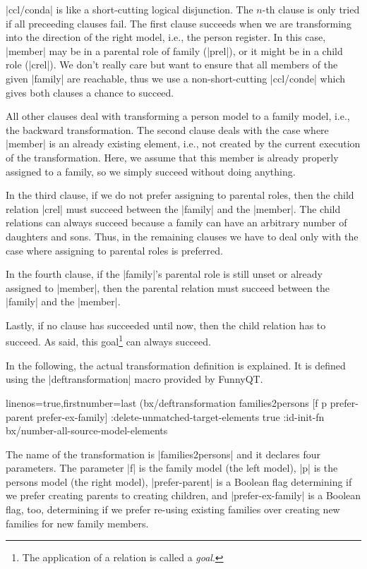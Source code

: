 \documentclass[a4paper]{article}
\newcommand{\code}{\clojureinline}
\begin{document}
\code|ccl/conda| is like a short-cutting logical disjunction.  The \(n\)-th
clause is only tried if all preceeding clauses fail.  The first clause succeeds
when we are transforming into the direction of the right model, i.e., the
person register.  In this case, \code|member| may be in a parental role of
family (\code|prel|), or it might be in a child role (\code|crel|).  We don't
really care but want to ensure that all members of the given \code|family| are
reachable, thus we use a non-short-cutting \code|ccl/conde| which gives both
clauses a chance to succeed.

All other clauses deal with transforming a person model to a family model,
i.e., the backward transformation.  The second clause deals with the case where
\code|member| is an already existing element, i.e., not created by the current
execution of the transformation.  Here, we assume that this member is already
properly assigned to a family, so we simply succeed without doing anything.

In the third clause, if we do not prefer assigning to parental roles, then the
child relation \code|crel| must succeed between the \code|family| and the
\code|member|.  The child relations can always succeed because a family can
have an arbitrary number of daughters and sons.  Thus, in the remaining clauses
we have to deal only with the case where assigning to parental roles is
preferred.

In the fourth clause, if the \code|family|'s parental role is still unset or
already assigned to \code|member|, then the parental relation must succeed
between the \code|family| and the \code|member|.

Lastly, if no clause has succeeded until now, then the child relation has to
succeed.  As said, this goal\footnote{The application of a relation is called a
  \emph{goal}.} can always succeed.

\bigskip{}

In the following, the actual transformation definition is explained.  It is
defined using the \code|deftransformation| macro provided by FunnyQT.

\begin{clojurecode*}{linenos=true,firstnumber=last}
(bx/deftransformation families2persons [f p prefer-parent prefer-ex-family]
  :delete-unmatched-target-elements true
  :id-init-fn bx/number-all-source-model-elements
\end{clojurecode*}

The name of the transformation is \code|families2persons| and it declares four
parameters.  The parameter \code|f| is the family model (the left model),
\code|p| is the persons model (the right model), \code|prefer-parent| is a
Boolean flag determining if we prefer creating parents to creating children,
and \code|prefer-ex-family| is a Boolean flag, too, determining if we prefer
re-using existing families over creating new families for new family members.
\end{document}
